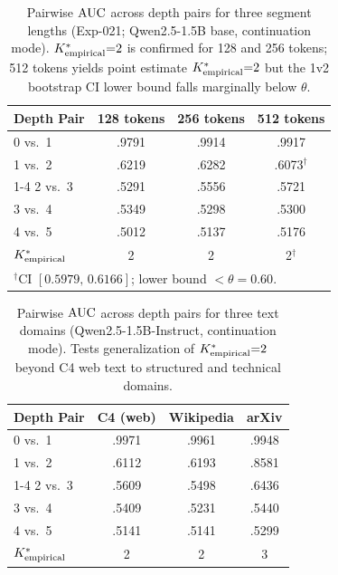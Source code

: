 \begin{table}[t]
  \centering
  \small
  \caption{Pairwise $\text{AUC}$ across depth pairs for three segment lengths (Exp-021; Qwen2.5-1.5B base, continuation mode). ${K^*_{\text{empirical}}}{=}2$ is confirmed for 128 and 256 tokens; 512 tokens yields point estimate ${K^*_{\text{empirical}}}{=}2$ but the 1v2 bootstrap CI lower bound falls marginally below $\theta$.}
  \label{tab:s11_length_ablation}
  \begin{tabular}{lccc}
    \toprule
    \textbf{Depth Pair} & \textbf{128 tokens} & \textbf{256 tokens} & \textbf{512 tokens} \\
    \midrule
    0 vs.\ 1 & .9791 & .9914 & .9917 \\
    1 vs.\ 2 & .6219 & .6282 & .6073$^\dagger$ \\
    \cmidrule(lr){1-4}
    2 vs.\ 3 & .5291 & .5556 & .5721 \\
    3 vs.\ 4 & .5349 & .5298 & .5300 \\
    4 vs.\ 5 & .5012 & .5137 & .5176 \\
    \midrule
    ${K^*_{\text{empirical}}}$ & 2 & 2 & 2$^\dagger$ \\
    \bottomrule
    \multicolumn{4}{l}{\footnotesize $^\dagger$CI $[0.5979,\,0.6166]$; lower bound ${<}\theta{=}0.60$.}
  \end{tabular}
\end{table}

\begin{table}[t]
  \centering
  \small
  \caption{Pairwise $\text{AUC}$ across depth pairs for three text domains (Qwen2.5-1.5B-Instruct, continuation mode). Tests generalization of ${K^*_{\text{empirical}}}{=}2$ beyond C4 web text to structured and technical domains.}
  \label{tab:s12_domain_ablation}
  \begin{tabular}{lccc}
    \toprule
    \textbf{Depth Pair} & \textbf{C4 (web)} & \textbf{Wikipedia} & \textbf{arXiv} \\
    \midrule
    0 vs.\ 1 & .9971 & .9961 & .9948 \\
    1 vs.\ 2 & .6112 & .6193 & .8581 \\
    \cmidrule(lr){1-4}
    2 vs.\ 3 & .5609 & .5498 & .6436 \\
    3 vs.\ 4 & .5409 & .5231 & .5440 \\
    4 vs.\ 5 & .5141 & .5141 & .5299 \\
    \midrule
    ${K^*_{\text{empirical}}}$ & 2 & 2 & 3 \\
    \bottomrule
  \end{tabular}
\end{table}

